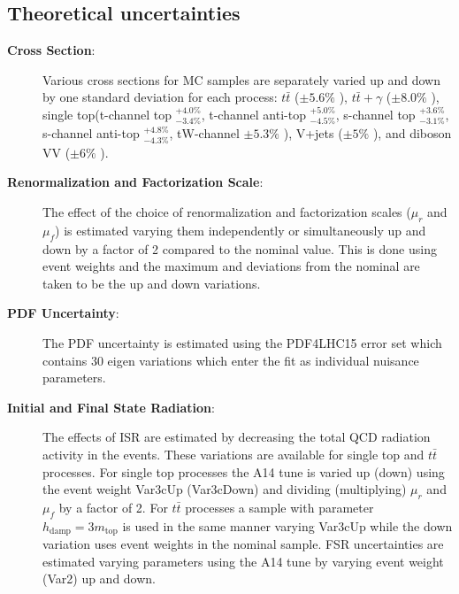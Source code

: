 \subsection{Theoretical uncertainties}
\begin{description}
\item[\textbf{Cross Section}:]  Various cross sections for MC samples are separately varied up and down by one standard deviation for each process: $t\bar{t}$ ($\pm5.6\%$ \cite{ttXSec}), $t\bar{t}+\gamma$ ($\pm 8.0\%$ \cite{ATLAS:2018pmj}), single top(t-channel top $^{+4.0\%}_{-3.4\%}$, t-channel anti-top $^{+5.0\%}_{-4.5\%}$, s-channel top $^{+3.6\%}_{-3.1\%}$, s-channel anti-top $^{+4.8\%}_{-4.3\%}$, tW-channel $\pm 5.3\%$ \cite{SingleTopXSec}), V+jets ($\pm5\%$ \cite{VXSec}), and diboson VV ($\pm 6\%$ \cite{VXSec}).  

\item[\textbf{Renormalization and Factorization Scale}:]  The effect of the choice of renormalization and factorization scales ($\mu_r$ and $\mu_f$) is estimated varying them independently or simultaneously up and down by a factor of 2 compared to the nominal value.  This is done using event weights and the maximum and deviations from the nominal are taken to be the up and down variations.

\item[\textbf{PDF Uncertainty}:]  The PDF uncertainty is estimated using the PDF4LHC15 error set which contains 30 eigen variations which enter the fit as individual nuisance parameters.

\item[\textbf{Initial and Final State Radiation}:] The effects of ISR are estimated by decreasing the total QCD radiation activity in the events.  These variations are available for single top and $t\bar{t}$ processes.  For single top processes the A14 tune is varied up (down) using the event weight Var3cUp (Var3cDown) and dividing (multiplying) $\mu_r$ and $\mu_f$ by a factor of 2.  For $t\bar{t}$ processes a sample with parameter $h_\text{damp}=3m_\text{top}$ is used in the same manner varying Var3cUp while the down variation uses event weights in the nominal sample.   FSR uncertainties are estimated varying parameters using the A14 tune by varying event weight (Var2) up and down. %


\end{description}
